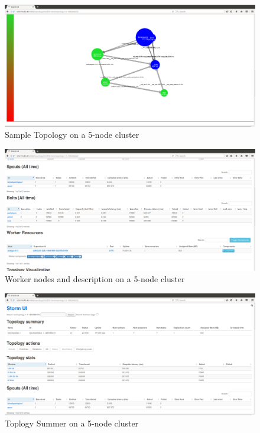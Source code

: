 \documentclass[9pt,twocolumn,twoside]{../../styles/osajnl}
\begin{document}
\begin{figure}[!htb]
  \includegraphics[width=\linewidth]{images/bench-2.png}
  \caption{Sample Topology on a 5-node cluster }
  \label{Sample Topology on a 5-node cluster}
\end{figure}

\begin{figure}[!htb]
  \includegraphics[width=\linewidth]{images/bench-3.png}
  \caption{Worker nodes and description on a 5-node cluster }
  \label{Worker nodes and description on a 5-node cluster}
\end{figure}

\begin{figure}[!htb]
  \includegraphics[width=\linewidth]{images/bench-4.png}
  \caption{Toplogy Summer on a 5-node cluster }
  \label{Topology summary on a 5-node cluster}
\end{figure}
\end{document}
